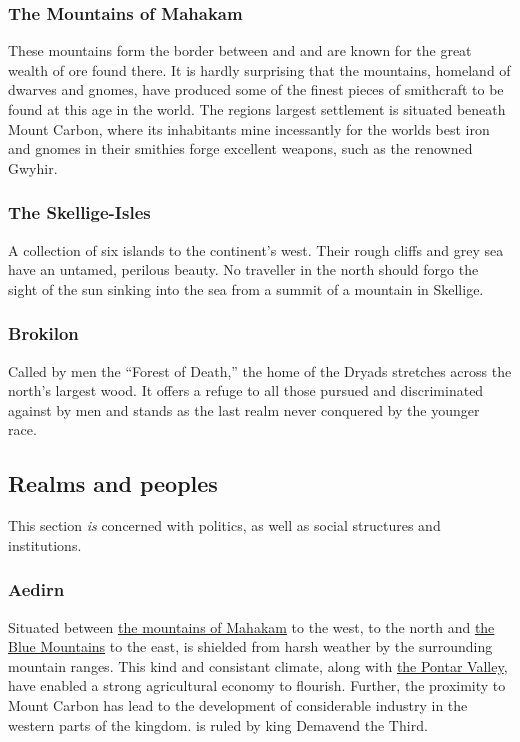 \documentclass[parskip=full,11pt]{scrreport}
\begin{document}
\subsubsection{The Mountains of Mahakam}\label{region:mahakamMtns}
These mountains form the border between  and  and are known for the great wealth
of ore found there. It is hardly surprising that the mountains, homeland of dwarves and gnomes, have produced some of the finest
pieces of smithcraft to be found at this age in the world. The regions largest settlement is situated beneath Mount Carbon,
where its inhabitants mine incessantly for the worlds best iron and gnomes in their smithies forge excellent weapons, such as
the renowned Gwyhir.

\subsubsection{The Skellige-Isles}\label{region:skellige}
A collection of six islands to the continent's west. Their rough cliffs and grey sea have an untamed, perilous beauty.
No traveller in the north should forgo the sight of the sun sinking into the sea from a summit of a mountain in Skellige.

\subsubsection{Brokilon}\label{region:brokilon}
Called by men the ``Forest of Death,'' the home of the Dryads stretches across the north's largest wood. It offers a refuge to
all those pursued and discriminated against by men and stands as the last realm never conquered by the younger race.

\newpage

\subsection{Realms and peoples}
This section \textit{is} concerned with politics, as well as social structures and institutions.

\subsubsection{Aedirn}\label{realm:aedirn}
Situated between \hyperref[region:mahakamMtns]{the mountains of Mahakam} to the west,  to the north and
\hyperref[region:blueMtns]{the Blue Mountains} to the east,  is shielded from harsh weather by the surrounding mountain
ranges. This kind and consistant climate, along with \hyperref[region:pontar]{the Pontar Valley}, have enabled a strong agricultural economy
to flourish. Further, the proximity to Mount Carbon has lead to the development of considerable industry in the western parts of the kingdom.
 is ruled by king Demavend the Third.
\end{document}
